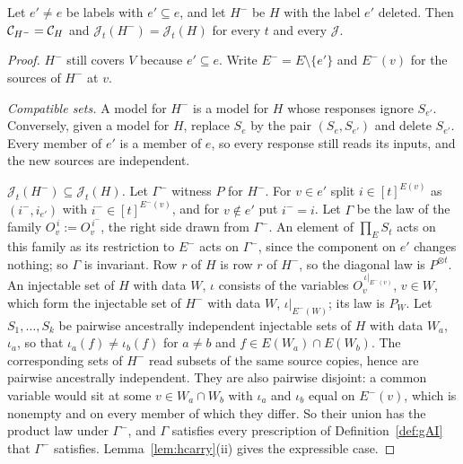\begin{lemma}[Absorption]\label{lem:absorption}
Let $e'\ne e$ be labels with $e'\subseteq e$, and let $H^-$ be $H$ with the label $e'$ deleted. Then $\mathcal C_{H^-}=\mathcal C_{H}$ and $\mathcal J_t(H^-)=\mathcal J_t(H)$ for every $t$ and every $\mathcal J$.
\end{lemma}

\begin{proof}
$H^-$ still covers $V$ because $e'\subseteq e$. Write $E^-=E\setminus\{e'\}$ and $E^-(v)$ for the sources of $H^-$ at $v$.

\emph{Compatible sets.} A model for $H^-$ is a model for $H$ whose responses ignore $S_{e'}$. Conversely, given a model for $H$, replace $S_e$ by the pair $(S_e,S_{e'})$ and delete $S_{e'}$. Every member of $e'$ is a member of $e$, so every response still reads its inputs, and the new sources are independent.

\emph{$\mathcal J_t(H^-)\subseteq\mathcal J_t(H)$.} Let $\Gamma^-$ witness $P$ for $H^-$. For $v\in e'$ split $i\in[t]^{E(v)}$ as $(i^-,i_{e'})$ with $i^-\in[t]^{E^-(v)}$, and for $v\notin e'$ put $i^-=i$. Let $\Gamma$ be the law of the family $O_v^{\,i}:=O_v^{\,i^-}$, the right side drawn from $\Gamma^-$. An element of $\prod_{E}S_t$ acts on this family as its restriction to $E^-$ acts on $\Gamma^-$, since the component on $e'$ changes nothing; so $\Gamma$ is invariant. Row $r$ of $H$ is row $r$ of $H^-$, so the diagonal law is $P^{\otimes t}$. An injectable set of $H$ with data $W$, $\iota$ consists of the variables $O_v^{\,\iota|_{E^-(v)}}$, $v\in W$, which form the injectable set of $H^-$ with data $W$, $\iota|_{E^-(W)}$; its law is $P_W$. Let $S_1,\dots,S_k$ be pairwise ancestrally independent injectable sets of $H$ with data $W_a$, $\iota_a$, so that $\iota_a(f)\ne\iota_b(f)$ for $a\ne b$ and $f\in E(W_a)\cap E(W_b)$. The corresponding sets of $H^-$ read subsets of the same source copies, hence are pairwise ancestrally independent. They are also pairwise disjoint: a common variable would sit at some $v\in W_a\cap W_b$ with $\iota_a$ and $\iota_b$ equal on $E^-(v)$, which is nonempty and on every member of which they differ. So their union has the product law under $\Gamma^-$, and $\Gamma$ satisfies every prescription of Definition~\ref{def:gAI} that $\Gamma^-$ satisfies. Lemma~\ref{lem:hcarry}(ii) gives the expressible case.


\end{proof}
